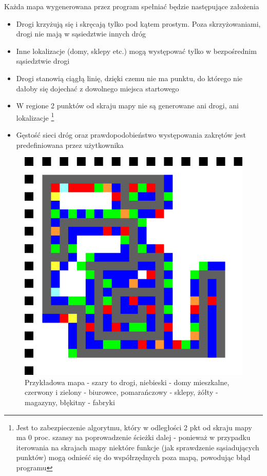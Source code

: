 \documentclass{article}
\begin{document}
Każda mapa wygenerowana przez program spełniać będzie następujące założenia

	\begin{itemize}
		\item Drogi krzyżują się i skręcają tylko pod kątem prostym. Poza skrzyżowaniami, drogi nie mają w sąsiedztwie innych dróg
		\item Inne lokalizacje (domy, sklepy etc.) mogą występować tylko w bezpośrednim sąsiedztwie drogi
		\item Drogi stanowią ciągłą linię, dzięki czemu nie ma punktu, do którego nie dałoby się dojechać z dowolnego miejsca startowego
		\item W regione 2 punktów od skraju mapy nie są generowane ani drogi, ani lokalizacje  \footnote{Jest to zabezpieczenie algorytmu, który w odległości 2 pkt od skraju mapy ma 0 proc. szansy na poprowadzenie ścieżki dalej - ponieważ w przypadku iterowania na skrajach mapy niektóre funkcje (jak sprawdzenie sąsiadujących punktów) mogą odnieść się do współrzędnych poza mapą, powodując błąd programu}
	 	\item Gęstość sieci dróg oraz prawdopodobieństwo występowania zakrętów jest predefiniowana przez użytkownika
	\end{itemize}

\begin{figure}
  \centering
\includegraphics[width=\linewidth]{../mapy/po_lokalizacji_sklepow.png}
  \caption{Przykładowa mapa - szary to drogi, niebieski - domy mieszkalne, czerwony i zielony - biurowce, pomarańczowy - sklepy, żółty - magazyny, błękitny - fabryki}
  \label{fig:mapa}
\end{figure}
\end{document}
